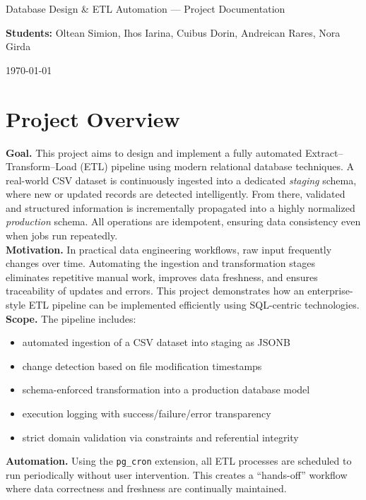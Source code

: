 \documentclass[11pt]{article}
\begin{document}
\begin{titlepage}
\centering
{\LARGE Database Design \& ETL Automation — Project Documentation\par}
\vspace{1em}
{\large \textbf{Students:} Oltean Simion, Ihos Iarina, Cuibus Dorin, Andreican Rares, Nora Girda\quad \par}
\vfill
{\large \today\par}
\end{titlepage}


\section{Project Overview}
\textbf{Goal.} This project aims to design and implement a fully automated Extract–Transform–Load (ETL) pipeline using modern relational database techniques. A real-world CSV dataset is continuously ingested into a dedicated \textit{staging} schema, where new or updated records are detected intelligently. From there, validated and structured information is incrementally propagated into a highly normalized \textit{production} schema. All operations are idempotent, ensuring data consistency even when jobs run repeatedly.\\[6pt]

\textbf{Motivation.} In practical data engineering workflows, raw input frequently changes over time. Automating the ingestion and transformation stages eliminates repetitive manual work, improves data freshness, and ensures traceability of updates and errors. This project demonstrates how an enterprise-style ETL pipeline can be implemented efficiently using SQL-centric technologies.\\[6pt]

\textbf{Scope.} The pipeline includes:
\begin{itemize}
\item automated ingestion of a CSV dataset into staging as JSONB
\item change detection based on file modification timestamps
\item schema-enforced transformation into a production database model
\item execution logging with success/failure/error transparency
\item strict domain validation via constraints and referential integrity
\end{itemize}

\textbf{Automation.} Using the \texttt{pg\_cron} extension, all ETL processes are scheduled to run periodically without user intervention. This creates a ``hands-off'' workflow where data correctness and freshness are continually maintained.\\[6pt]
\end{document}
